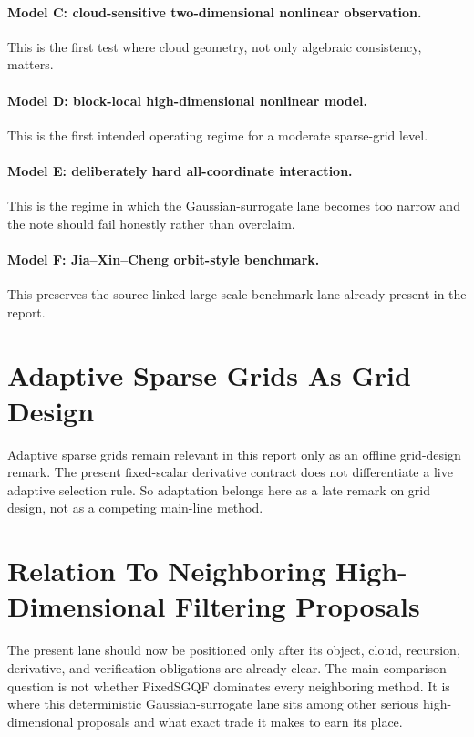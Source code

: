 \documentclass[11pt]{article}
\numberwithin{equation}{section}
\begin{document}
\paragraph{Model C: cloud-sensitive two-dimensional nonlinear observation.}
This is the first test where cloud geometry, not only algebraic consistency,
matters.

\paragraph{Model D: block-local high-dimensional nonlinear model.}
This is the first intended operating regime for a moderate sparse-grid level.

\paragraph{Model E: deliberately hard all-coordinate interaction.}
This is the regime in which the Gaussian-surrogate lane becomes too narrow and the
note should fail honestly rather than overclaim.

\paragraph{Model F: Jia--Xin--Cheng orbit-style benchmark.}
This preserves the source-linked large-scale benchmark lane already present in the
report.

\section{Adaptive Sparse Grids As Grid Design}
\label{sec:p31-adaptive-grid-design}

Adaptive sparse grids remain relevant in this report only as an offline grid-design
remark.  The present fixed-scalar derivative contract does not differentiate a
live adaptive selection rule.  So adaptation belongs here as a late remark on grid
design, not as a competing main-line method.

\section{Relation To Neighboring High-Dimensional Filtering Proposals}
\label{sec:p31-comparison}

The present lane should now be positioned only after its object, cloud,
recursion, derivative, and verification obligations are already clear.  The main
comparison question is not whether FixedSGQF dominates every neighboring method.
It is where this deterministic Gaussian-surrogate lane sits among other serious
high-dimensional proposals and what exact trade it makes to earn its place.
\end{document}
